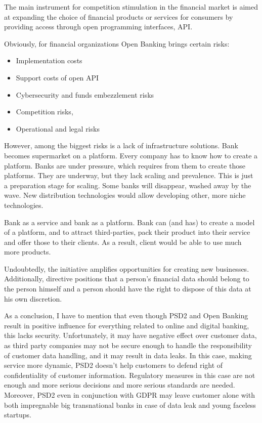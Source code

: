 The main instrument for competition stimulation in the financial market is aimed at expanding the choice of financial products or services for consumers by providing access through open programming interfaces, API.

Obviously, for financial organizations Open Banking brings certain risks: 
\begin{itemize}
    \item Implementation costs
    \item Support costs of open API 
    \item Cybersecurity and funds embezzlement risks
    \item Competition risks, 
    \item Operational and legal risks
\end{itemize}

However, among the biggest risks is a lack of infrastructure solutions.
Bank becomes supermarket on a platform.
Every company has to know how to create a platform.
Banks are under pressure, which requires from them to create those platforms.
They are underway, but they lack scaling and prevalence.
This is just a preparation stage for scaling.
Some banks will disappear, washed away by the wave.
New distribution technologies would allow developing other, more niche technologies.

Bank as a service and bank as a platform.
Bank can (and has) to create a model of a platform, and to attract third-parties, pack their product into their service and offer those to their clients.
As a result, client would be able to use much more products.

Undoubtedly, the initiative amplifies opportunities for creating new businesses. 
Additionally, directive positions that a person's financial data should belong to the person himself and a person should have the right to dispose of this data at his own discretion.

As a conclusion, I have to mention that even though PSD2 and Open Banking result in positive influence for everything related to online and digital banking, this lacks security. Unfortunately, it may have negative effect over customer data, as third party companies may not be secure enough to handle the responsibility of customer data handling, and it may result in data leaks. In this case, making service more dynamic, PSD2 doesn't help customers to defend right of confidentiality of customer information. 
Regulatory measures in this case are not enough and more serious decisions and more serious standards are needed.
Moreover, PSD2 even in conjunction with GDPR may leave customer alone with both impregnable big transnational banks in case of data leak and young faceless startups.

